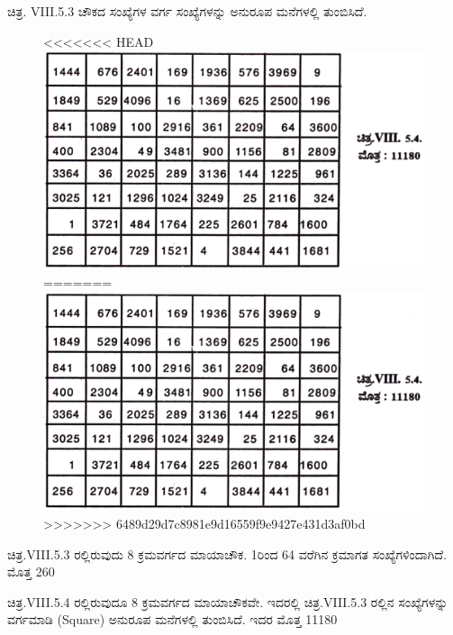 ಚಿತ್ರ. VIII.5.3 ಚೌಕದ ಸಂಖ್ಯೆಗಳ ವರ್ಗ ಸಂಖ್ಯೆಗಳನ್ನು ಅನುರೂಪ ಮನೆಗಳಲ್ಲಿ ತುಂಬಿ\-ಸಿದೆ.
\begin{figure}[H]
<<<<<<< HEAD
\includegraphics{src/figures/chap7/fig7-18.jpg}
=======
\includegraphics[scale=0.85]{src/figures/chap7/fig7.18.jpg}
>>>>>>> 6489d29d7c8981e9d16559f9e9427e431d3af0bd
\end{figure}

ಚಿತ್ರ.VIII.5.3 ರಲ್ಲಿರುವುದು 8 ಕ್ರಮವರ್ಗದ ಮಾಯಾಚೌಕ. 1ರಿಂದ 64 ವರೆಗಿನ ಕ್ರಮಾಗತ ಸಂಖ್ಯೆಗಳಿಂದಾಗಿದೆ. ಮೊತ್ತ 260

ಚಿತ್ರ.VIII.5.4 ರಲ್ಲಿರುವುದೂ 8 ಕ್ರಮವರ್ಗದ ಮಾಯಾಚೌಕವೇ. ಇದರಲ್ಲಿ ಚಿತ್ರ.VIII.5.3 ರಲ್ಲಿನ ಸಂಖ್ಯೆಗಳನ್ನು ವರ್ಗಮಾಡಿ (Square) ಅನುರೂಪ ಮನೆಗಳಲ್ಲಿ ತುಂಬಿಸಿದೆ. ಇದರ ಮೊತ್ತ 11180

